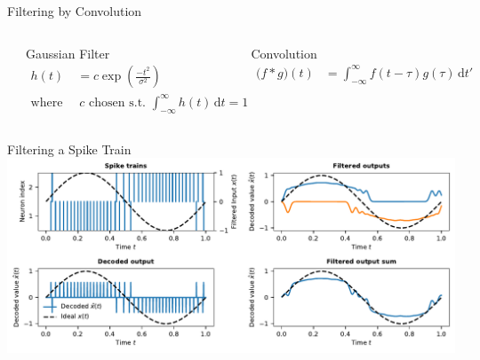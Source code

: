 \documentclass[handout,aspectratio=169]{beamer}
\begin{document}
\begin{frame}{Filtering by Convolution}
	\begin{columns}
		\includegraphics[width=\textwidth]{media/gaussian_filters.pdf}
		\begin{block}{Gaussian Filter}
			\begin{align*}
				h(t) &= c \exp \left( \frac{-t^2}{\sigma^2} \right) \\
				\text{where }  &~c \text{ chosen s.t. } {\textstyle \int_{-\infty}^\infty h(t) \,\mathrm{d}t = 1}
			\end{align*}
		\end{block}
		\begin{block}{Convolution}
			\begin{align*}
				\big( f \ast g \big)(t) &= \int_{-\infty}^{\infty} f(t - \tau) g(\tau) \,\mathrm{d}t'
			\end{align*}
		\end{block}
	\end{columns}
\end{frame}

\begin{frame}{Filtering a Spike Train}
	\includegraphics[width=\textwidth]{media/two_neurons_filtered.pdf}
\end{frame}
\end{document}
